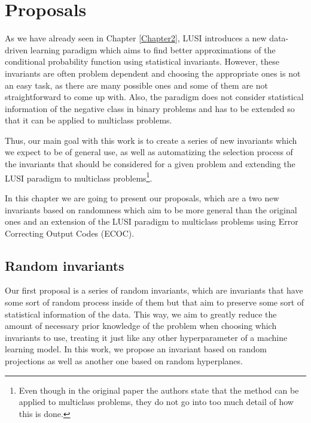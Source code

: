 
\newcommand{\reals}[1]{\mathbb{R}^{#1}}

\chapter{Proposals} %
\label{Chapter3}

As we have already seen in Chapter \ref{Chapter2}, LUSI introduces a new data-driven learning
paradigm which aims to find better approximations of the conditional probability function using
statistical invariants. However, these invariants are often problem dependent and choosing the
appropriate ones is not an easy task, as there are many possible ones and some of them are not
straightforward to come up with. Also, the paradigm does not consider statistical information
of the negative class in binary problems and has to be extended so that it can be applied to
multiclass problems.

Thus, our main goal with this work is to create a series of new invariants which we expect to be of
general use, as well as automatizing the selection process of the invariants that should be considered
for a given problem and extending the LUSI paradigm to multiclass problems\footnote{Even though in the
original paper the authors state that the method can be applied to multiclass problems, they do not go
into too much detail of how this is done.}.

In this chapter we are going to present our proposals, which are a two new invariants based on randomness
which aim to be more general than the original ones and an extension of the LUSI paradigm to multiclass problems
using Error Correcting Output Codes (ECOC).

\section{Random invariants}

Our first proposal is a series of random invariants, which are invariants that have some sort of random
process inside of them but that aim to preserve some sort of statistical information of the data. This way,
we aim to greatly reduce the amount of necessary prior knowledge of the problem when choosing which invariants
to use, treating it just like any other hyperparameter of a machine learning model. In this work, we propose
an invariant based on random projections as well as another one based on random hyperplanes.

